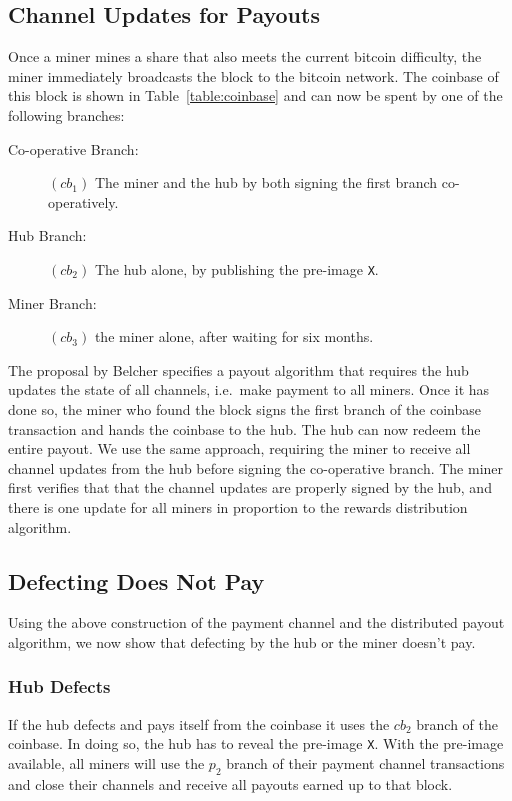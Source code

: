 \documentclass{article}
\begin{document}
\subsection{Channel Updates for Payouts}

Once a miner mines a share that also meets the current bitcoin
difficulty, the miner immediately broadcasts the block to the bitcoin
network. The coinbase of this block is shown in
Table~\ref{table:coinbase} and can now be spent by one of the following
branches:

\begin{description}
\item[Co-operative Branch:] $(cb_1)$ The miner and the hub by both signing the
  first branch co-operatively.
\item[Hub Branch:] $(cb_2)$ The hub alone, by publishing the pre-image \verb|X|.
\item[Miner Branch:] $(cb_3)$ the miner alone, after waiting for six months.
\end{description}

The proposal by Belcher specifies a payout algorithm that requires the
hub updates the state of all channels, i.e.\ make payment to all
miners. Once it has done so, the miner who found the block signs the
first branch of the coinbase transaction and hands the coinbase to the
hub. The hub can now redeem the entire payout. We use the same
approach, requiring the miner to receive all channel updates from the
hub before signing the co-operative branch. The miner first verifies
that that the channel updates are properly signed by the hub, and
there is one update for all miners in proportion to the rewards
distribution algorithm.

\subsection{Defecting Does Not Pay}\label{ref:defecting}

Using the above construction of the payment channel and the
distributed payout algorithm, we now show that defecting by the hub or
the miner doesn't pay.

\subsubsection{Hub Defects}\label{ref:hub-defects}

If the hub defects and pays itself from the coinbase it uses the
$cb_2$ branch of the coinbase. In doing so, the hub has to reveal the
pre-image \verb|X|. With the pre-image available, all miners will use
the $p_2$ branch of their payment channel transactions and close their
channels and receive all payouts earned up to that block.
\end{document}
